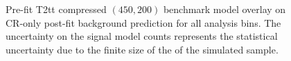 \begin{figure}[!h]
{        \label{fig:T2tt_compressed_MR_4j}
    } \\
     ~~
     \\
    \caption{
        Pre-fit T2tt compressed $(450,200)$ benchmark model overlay on CR-only
        post-fit background prediction for all analysis bins. The uncertainty
        on the signal model counts represents the statistical uncertainty due
        to the finite size of the of the simulated sample.
    }
    \label{fig:T2tt_compressed_MR}
\end{figure}


